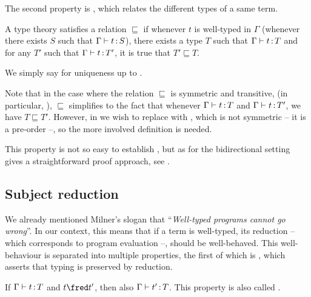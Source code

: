 The second property is , which relates the different types
of a same term.

\begin{property}
  \label{prop:uniqueness}
  A type theory satisfies  a relation $\sqsubseteq$
  if whenever $t$ is well-typed in $\Gamma$ (\ie whenever there exists $S$ such that $\Gamma \vdash t \operatorname{\mathrel{:}} S$), there exists a type $T$ such that $\Gamma \vdash t \operatorname{\mathrel{:}} T$
  and for any $T'$ such that $\Gamma \vdash t \operatorname{\mathrel{:}} T'$, it is true that $T' \sqsubseteq T$.

  We simply say  for uniqueness up to .
\end{property}

Note that in the case where the relation $\sqsubseteq$ is symmetric and transitive,
(in particular, ),  $\sqsubseteq$ simplifies
to the fact that whenever $\Gamma \vdash t \operatorname{\mathrel{:}} T$ and $\Gamma \vdash t \operatorname{\mathrel{:}} T'$,
we have $T \sqsubseteq T'$. However, in  we wish to replace  with
, which is not symmetric – it is a pre-order –, so the more involved
definition is needed.

This property is not so easy to establish%
,
but as for  the bidirectional setting gives a straightforward proof approach,
see .

\subsection{Subject reduction}

We already mentioned Milner’s slogan that “\textit{Well-typed programs cannot go wrong}”.
In our context, this means that if a term is well-typed, its reduction – which corresponds to
program evaluation –, should be well-behaved. This well-behaviour is separated 
into multiple properties, the first of which is ,
which asserts that typing is preserved by reduction.

\begin{property}
  \label{prop:sr}
  If $\Gamma \vdash t \operatorname{\mathrel{:}} T$ and $t \red t'$, then also $\Gamma \vdash t' \operatorname{\mathrel{:}} T$.
  This property is also called .
\end{property}

